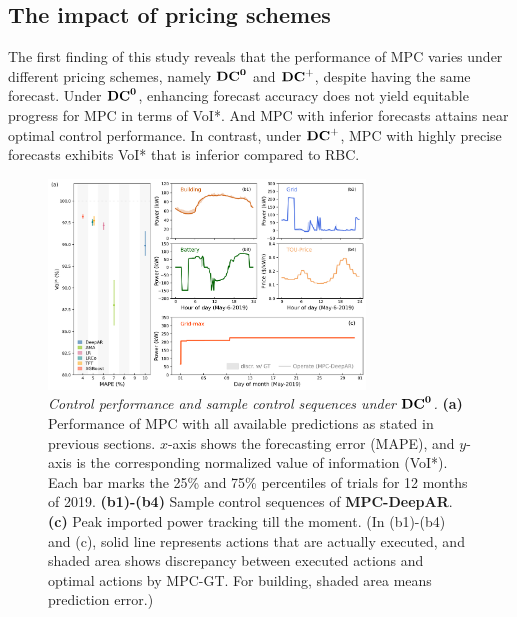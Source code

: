 
\newcommand{\noise}{\mathbf{U}}
\newcommand{\noisePos}{\mathbf{U^+}}
\newcommand{\noiseNeg}{\mathbf{U^-}}


\subsection{The impact of pricing schemes}
    \label{sec:Polarized accuracy}

The first finding of this study reveals that the performance of MPC varies under different pricing schemes, namely $\mathbf{{DC}^{0}}$ and $\mathbf{{DC}^{+}}$, despite having the same forecast. Under $\mathbf{{DC}^{0}}$, enhancing forecast accuracy does not yield equitable progress for MPC in terms of VoI*. And MPC with inferior forecasts attains near optimal control performance. In contrast, under $\mathbf{{DC}^{+}}$, MPC with highly precise forecasts exhibits VoI* that is inferior compared to RBC. 


\begin{figure}[!ht]
\centering
  \includegraphics[width=0.75\textwidth]{figures/fig-2-without-dc-2.png}
  \caption{\textit{Control performance and sample control sequences under $\mathbf{{DC}^{0}}$.} \textbf{(a)} Performance of MPC with all available predictions as stated in previous sections. $x$-axis shows the forecasting error (MAPE), and $y$-axis is the corresponding normalized value of information (VoI*). Each bar marks the 25\% and 75\% percentiles of trials for 12 months of 2019. \textbf{(b1)-(b4)} Sample control sequences of \textbf{MPC-DeepAR}. \textbf{(c)} Peak imported power tracking till the moment. (In (b1)-(b4) and (c), solid line represents actions that are actually executed, and shaded area shows discrepancy between executed actions and optimal actions by MPC-GT. For building, shaded area means prediction error.) }
  \label{fig:group-plot-0dc}
\end{figure}

